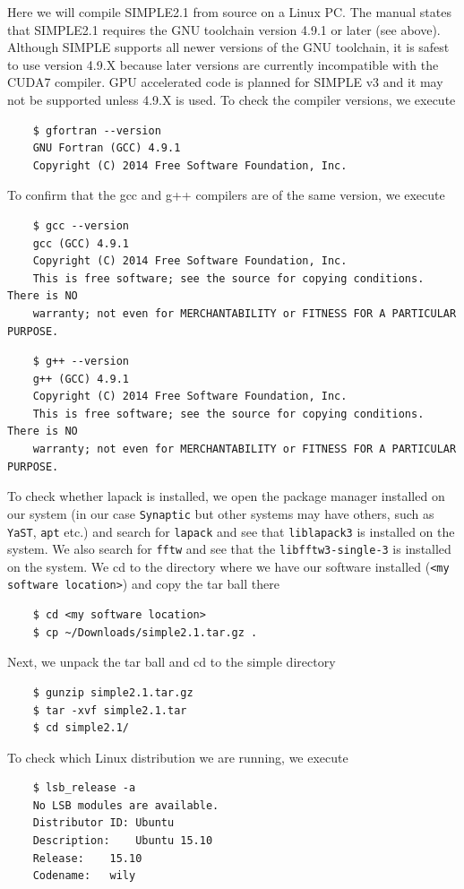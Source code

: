 \documentclass[a4paper,11pt]{article}
\begin{document}
Here we will compile SIMPLE2.1 from source on a Linux PC. The manual states that  SIMPLE2.1 requires the GNU toolchain version 4.9.1 or later (see above). Although SIMPLE supports all newer versions of the GNU toolchain, it is safest to use version 4.9.X because later versions are currently incompatible with the CUDA7 compiler. GPU accelerated code is planned for SIMPLE v3 and it may not be supported unless 4.9.X is used. To check the compiler versions, we execute
\begin{verbatim}
    $ gfortran --version
    GNU Fortran (GCC) 4.9.1
    Copyright (C) 2014 Free Software Foundation, Inc.
\end{verbatim}
To confirm that the gcc and g++ compilers are of the same version, we execute
\begin{verbatim}
    $ gcc --version
    gcc (GCC) 4.9.1
    Copyright (C) 2014 Free Software Foundation, Inc.
    This is free software; see the source for copying conditions.  There is NO
    warranty; not even for MERCHANTABILITY or FITNESS FOR A PARTICULAR PURPOSE.
\end{verbatim}
\begin{verbatim}
    $ g++ --version
    g++ (GCC) 4.9.1
    Copyright (C) 2014 Free Software Foundation, Inc.
    This is free software; see the source for copying conditions.  There is NO
    warranty; not even for MERCHANTABILITY or FITNESS FOR A PARTICULAR PURPOSE.
\end{verbatim}
To check whether lapack is installed, we open the package manager installed on our system (in our case \texttt{Synaptic} but other systems may have others, such as \texttt{YaST}, \texttt{apt} etc.) and search for \texttt{lapack} and see that \texttt{liblapack3} is installed on the system. We also search for \texttt{fftw} and see that the \texttt{libfftw3-single-3} is installed on the system. We cd to the directory  where we have our software installed (\texttt{<my software location>}) and copy the tar ball there
\begin{verbatim}
    $ cd <my software location>
    $ cp ~/Downloads/simple2.1.tar.gz .
\end{verbatim}
Next, we unpack the tar ball and cd to the simple directory
\begin{verbatim}
    $ gunzip simple2.1.tar.gz
    $ tar -xvf simple2.1.tar
    $ cd simple2.1/
\end{verbatim}
To check which Linux distribution we are running, we execute
\begin{verbatim}
    $ lsb_release -a
    No LSB modules are available.
    Distributor ID: Ubuntu
    Description:    Ubuntu 15.10
    Release:    15.10
    Codename:   wily
\end{verbatim}
\end{document}
